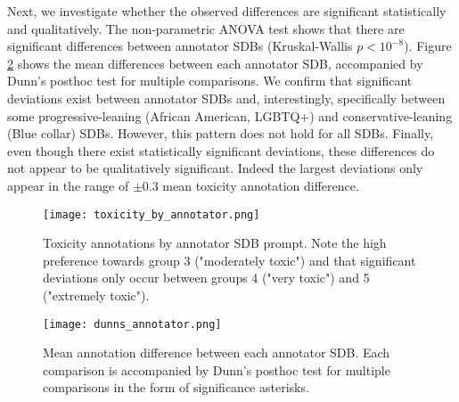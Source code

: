 Next, we investigate whether the observed differences are significant statistically and qualitatively. The non-parametric ANOVA test shows that there are significant differences between annotator SDBs (Kruskal-Wallis $p<10^{-8}$). Figure \ref{fig::toxicity-annotator-significance} shows the mean differences between each annotator SDB, accompanied by Dunn's posthoc test for multiple comparisons. We confirm that significant deviations exist between annotator SDBs and, interestingly, specifically between some progressive-leaning (African American, LGBTQ+) and conservative-leaning (Blue collar) SDBs. However, this pattern does not hold for all SDBs. Finally, even though there exist statistically significant deviations, these differences do not appear to be qualitatively significant. Indeed the largest deviations only appear in the range of $\pm 0.3$ mean toxicity annotation difference.

\begin{figure}
	\centering
	\texttt{[image: toxicity\_by\_annotator.png]}
	\caption{Toxicity annotations by annotator SDB prompt. Note the high preference towards group 3 ("moderately toxic") and that significant deviations only occur between groups 4 ("very toxic") and 5 ("extremely toxic").}
	\label{fig::toxicity-annotator}
\end{figure}

\begin{figure}
	\centering
	\texttt{[image: dunns\_annotator.png]}
	\caption{Mean annotation difference between each annotator SDB. Each comparison is accompanied by Dunn's posthoc test for multiple comparisons in the form of significance asterisks.}
	\label{fig::toxicity-annotator-significance}
\end{figure}